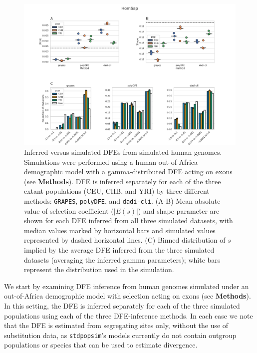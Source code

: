 \documentclass[hidelinks]{article}
\newcommand{\stdpopsim}{\texttt{stdpopsim}\xspace}
\newcommand{\polydfe}{\texttt{polyDFE}\xspace}
\newcommand{\dadicli}{\texttt{dadi-cli}\xspace}
\newcommand{\grapes}{\texttt{GRAPES}\xspace}
\begin{document}
    \begin{figure}[b!]
        \centering
        \includegraphics[width=\linewidth]{figures/HomSap/OOA/HomSap_discrete_DFE}
        \caption{Inferred versus simulated DFEs from simulated human genomes.
        Simulations were performed using a human out-of-Africa demographic model with a gamma-distributed DFE
        acting on exons (see \textbf{Methods}).
        DFE is inferred separately for each of the three extant populations (CEU, CHB, and YRI)
        by three different methods: \grapes, \polydfe , and \dadicli.
        (A-B) Mean absolute value of selection coefficient ($\lvert E(s) \rvert $) and shape parameter are
        shown for each DFE inferred from all three simulated datasets,
        with median values marked by horizontal bars
        and simulated values represented by dashed horizontal lines.
        (C) Binned distribution of $s$ implied by the average DFE inferred from the three simulated datasets (averaging the inferred gamma parameters);
        white bars represent the distribution used in the simulation.
        }
        \label{fig:homsap-dfe.ooa}
    \end{figure}



    We start by examining DFE inference from human genomes simulated under an out-of-Africa demographic model
    with selection acting on exons (see \textbf{Methods}).
    In this setting, the DFE is inferred separately for each of the three simulated populations
    using each of the three DFE-inference methods.
    In each case we note that the DFE is estimated from segregating sites only,
    without the use of substitution data, as \stdpopsim's models currently do not
    contain outgroup populations or species that can be used to estimate divergence.
\end{document}
